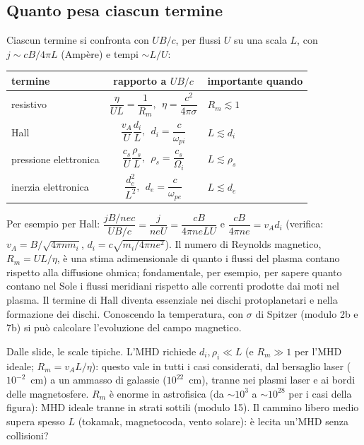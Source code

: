 \subsection{Quanto pesa ciascun termine}
Ciascun termine si confronta con $UB/c$, per flussi $U$ su una scala $L$, con $j\sim cB/4\pi L$ (Amp\`ere) e tempi $\sim L/U$:
\begin{center}
\small
\begin{tabular}{|l|c|l|}
\hline
termine & rapporto a $UB/c$ & importante quando\\
\hline
resistivo & $\dfrac{\eta}{UL}=\dfrac1{R_m},\ \ \eta=\dfrac{c^2}{4\pi\sigma}$ & $R_m\lesssim1$\\
\hline
Hall & $\dfrac{v_A}{U}\dfrac{d_i}{L},\ \ d_i=\dfrac{c}{\omega_{pi}}$ & $L\lesssim d_i$\\
\hline
pressione elettronica & $\dfrac{c_s}{U}\dfrac{\rho_s}{L},\ \ \rho_s=\dfrac{c_s}{\Omega_i}$ & $L\lesssim\rho_s$\\
\hline
inerzia elettronica & $\dfrac{d_e^2}{L^2},\ \ d_e=\dfrac{c}{\omega_{pe}}$ & $L\lesssim d_e$\\
\hline
\end{tabular}
\end{center}
Per esempio per Hall: $\dfrac{jB/nec}{UB/c}=\dfrac{j}{neU}=\dfrac{cB}{4\pi neLU}$ e $\dfrac{cB}{4\pi ne}=v_Ad_i$ (verifica: $v_A=B/\sqrt{4\pi nm_i}$, $d_i=c\sqrt{m_i/4\pi ne^2}$). Il numero di Reynolds magnetico, $R_m=UL/\eta$, è una stima adimensionale di quanto i flussi del plasma contano rispetto alla diffusione ohmica; fondamentale, per esempio, per sapere quanto contano nel Sole i flussi meridiani rispetto alle correnti prodotte dai moti nel plasma. Il termine di Hall diventa essenziale nei dischi protoplanetari e nella formazione dei dischi. Conoscendo la temperatura, con $\sigma$ di Spitzer (modulo 2b e 7b) si può calcolare l'evoluzione del campo magnetico.

Dalle slide, le scale tipiche. L'MHD richiede $d_i,\rho_i\ll L$ (e $R_m\gg1$ per l'MHD ideale; $R_m=v_AL/\eta$): questo vale in tutti i casi considerati, dal bersaglio laser ($10^{-2}$~cm) a un ammasso di galassie ($10^{22}$~cm), tranne nei plasmi laser e ai bordi delle magnetosfere. $R_m$ è enorme in astrofisica (da $\sim10^{3}$ a $\sim10^{28}$ per i casi della figura): MHD ideale tranne in strati sottili (modulo 15). Il cammino libero medio supera spesso $L$ (tokamak, magnetocoda, vento solare): è lecita un'MHD senza collisioni?

